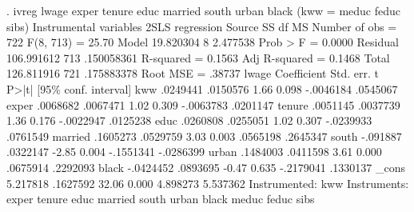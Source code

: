 . ivreg lwage exper tenure educ married south urban black (kww = meduc feduc sibs)
{\smallskip}
Instrumental variables 2SLS regression
{\smallskip}
      Source {\VBAR}       SS           df       MS      Number of obs   =       722
   F(8, 713)       =     25.70
       Model {\VBAR}   19.820304         8    2.477538   Prob > F        =    0.0000
    Residual {\VBAR}  106.991612       713  .150058361   R-squared       =    0.1563
   Adj R-squared   =    0.1468
       Total {\VBAR}  126.811916       721  .175883378   Root MSE        =    .38737
{\smallskip}
       lwage {\VBAR} Coefficient  Std. err.      t    P>|t|     [95\% conf. interval]
         kww {\VBAR}   .0249441   .0150576     1.66   0.098    -.0046184    .0545067
       exper {\VBAR}   .0068682   .0067471     1.02   0.309    -.0063783    .0201147
      tenure {\VBAR}   .0051145   .0037739     1.36   0.176    -.0022947    .0125238
        educ {\VBAR}   .0260808   .0255051     1.02   0.307    -.0239933    .0761549
     married {\VBAR}   .1605273   .0529759     3.03   0.003     .0565198    .2645347
       south {\VBAR}   -.091887   .0322147    -2.85   0.004    -.1551341   -.0286399
       urban {\VBAR}   .1484003   .0411598     3.61   0.000     .0675914    .2292093
       black {\VBAR}  -.0424452   .0893695    -0.47   0.635    -.2179041    .1330137
       _cons {\VBAR}   5.217818   .1627592    32.06   0.000     4.898273    5.537362
Instrumented: kww
 Instruments: exper tenure educ married south urban black meduc feduc sibs
{\smallskip}
